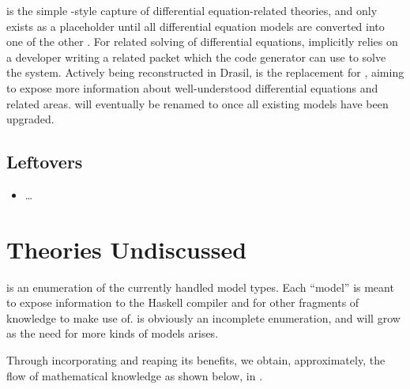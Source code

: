 \DEModel{} is the simple \RelationConcept{}-style capture of differential
equation-related theories, and only exists as a placeholder until all
differential equation models are converted into one of the other \ModelKinds{}.
For related solving of differential equations, \DEModel{} implicitly relies on a
developer writing a related \ODEInfo{} packet which
the code generator can use to solve the system. Actively being reconstructed in
Drasil, \NewDEModel{} is the replacement for \DEModel{},
aiming to expose more information about well-understood differential equations
and related areas. \NewDEModel{} will eventually be renamed to \DEModel{} once
all existing \DEModel{} models have been upgraded.


\subsection{Leftovers}


\begin{itemize}

	\item \OthModel{} \ldots{}

\end{itemize}

\section{Theories Undiscussed}

\ModelKinds{} is an enumeration of the currently handled model types. Each
``model'' is meant to expose information to the Haskell compiler and for other
fragments of knowledge to make use of. \ModelKinds{} is obviously an incomplete
enumeration, and will grow as the need for more kinds of models arises.

Through incorporating \ModelKinds{} and reaping its benefits, we obtain,
approximately, the flow of mathematical knowledge as shown below, in
.

\theoriesWithModelKinds{}

